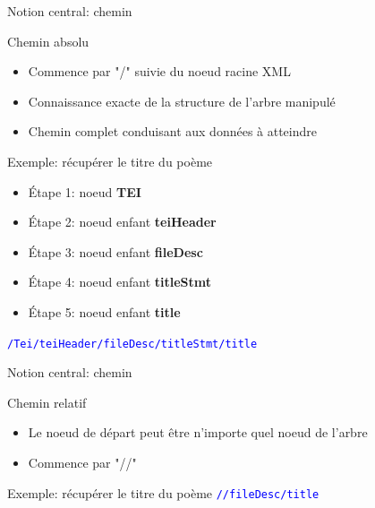 \begin{frame}{Notion central: chemin}
    \begin{block}{Chemin absolu}
        \begin{itemize}
            \item Commence par "/" suivie du noeud racine XML
            \item Connaissance exacte de la structure de l'arbre manipulé
            \item Chemin complet conduisant aux données à atteindre
        \end{itemize}
    \end{block}
    \begin{block}{Exemple: récupérer le titre du poème}
        \begin{itemize}
            \item Étape 1: noeud \textbf{TEI}
            \item Étape 2: noeud enfant \textbf{teiHeader}
            \item Étape 3: noeud enfant \textbf{fileDesc}
            \item Étape 4: noeud enfant \textbf{titleStmt}
            \item Étape 5: noeud enfant \textbf{title}
        \end{itemize}
        \textcolor{blue}{\texttt{/Tei/teiHeader/fileDesc/titleStmt/title}}
    \end{block}
\end{frame}

\begin{frame}{Notion central: chemin}
    \begin{block}{Chemin relatif}
        \begin{itemize}
            \item Le noeud de départ peut être n'importe quel noeud de l'arbre
            \item Commence par "//"
        \end{itemize}
    \end{block}
    \begin{block}{Exemple: récupérer le titre du poème}
        \vspace{0.5em}
        \textcolor{blue}{\texttt{//fileDesc/title}}
    \end{block}
\end{frame}
